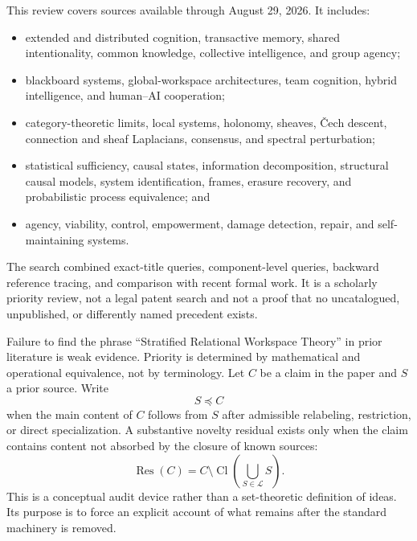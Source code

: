This review covers sources available through August 29, 2026. It includes:
\begin{itemize}
\item extended and distributed cognition, transactive memory, shared
 intentionality, common knowledge, collective intelligence, and group
 agency;
\item blackboard systems, global-workspace architectures, team cognition,
 hybrid intelligence, and human--AI cooperation;
\item category-theoretic limits, local systems, holonomy, sheaves, \v{C}ech
 descent, connection and sheaf Laplacians, consensus, and spectral
 perturbation;
\item statistical sufficiency, causal states, information decomposition,
 structural causal models, system identification, frames, erasure
 recovery, and probabilistic process equivalence; and
\item agency, viability, control, empowerment, damage detection, repair, and
 self-maintaining systems.
\end{itemize}
The search combined exact-title queries, component-level queries, backward
reference tracing, and comparison with recent formal work. It is a scholarly
priority review, not a legal patent search and not a proof that no uncatalogued,
unpublished, or differently named precedent exists.


Failure to find the phrase ``Stratified Relational Workspace Theory'' in prior
literature is weak evidence. Priority is determined by mathematical and
operational equivalence, not by terminology. Let \(C\) be a claim in the
paper and \(S\) a prior source. Write
\[
S\preccurlyeq C
\]
when the main content of \(C\) follows from \(S\) after admissible relabeling,
restriction, or direct specialization. A substantive novelty residual exists
only when the claim contains content not absorbed by the closure of known
sources:
\[
\operatorname{Res}(C)
=
C\setminus
\operatorname{Cl}
\left(
\bigcup_{S\in\mathcal L}S
\right).
\]
This is a conceptual audit device rather than a set-theoretic definition of
ideas. Its purpose is to force an explicit account of what remains after the
standard machinery is removed.


